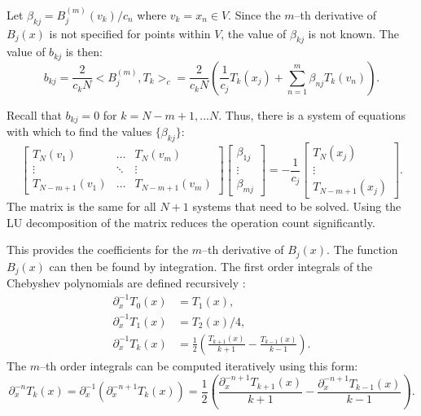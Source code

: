 \documentclass{sfuthesis}
\begin{document}
Let $\beta_{kj} = B^{(m)}_j (v_k)/c_n$ where $v_k = x_n \in V$.
Since the $m$--th derivative of $B_j(x)$ is not specified for points within $V$, the value of $\beta_{kj}$ is not known.
The value of $b_{kj}$ is then:
\begin{equation}
b_{kj} = \frac{2}{c_k N} <B_j^{(m)}, T_k>_c = \frac{2}{c_k N} \left ( \frac{1}{c_j} T_k(x_j) + \sum_{n=1}^m \beta_{nj} T_k(v_n) \right ).
\end{equation}

Recall that $b_{kj} = 0$ for $k = N-m+1,...N$.
Thus, there is a system of equations with which to find the values $\{ \beta_{kj} \}$:
\begin{equation}
\begin{bmatrix} T_N(v_1) & \dots & T_N(v_m) \\ \vdots & \ddots & \vdots \\ T_{N-m+1}(v_1) & \dots & T_{N-m+1}(v_m) \end{bmatrix}
\begin{bmatrix} \beta_{1j} \\ \vdots \\ \beta_{mj} \end{bmatrix} = 
- \frac{1}{c_j} \begin{bmatrix} T_N(x_j) \\ \vdots \\ T_{N-m+1}(x_j) \end{bmatrix} .
\end{equation}
The matrix is the same for all $N+1$ systems that need to be solved.
Using the LU decomposition of the matrix reduces the operation count significantly.

This provides the coefficients for the $m$--th derivative of $B_j(x)$.
The function $B_j(x)$ can then be found by integration.
The first order integrals of the Chebyshev polynomials are defined recursively \cite{mason2002chebyshev}:
\begin{equation} \label{integrals}
\begin{aligned}
 \partial_x^{-1} T_0(x) & = T_1(x), \\
 \partial_x^{-1} T_1(x) & = T_2(x) / 4, \\
 \partial_x^{-1}T_k(x) & = \frac{1}{2} \left ( \frac{T_{k+1}(x)}{k+1} - \frac{T_{k-1}(x)}{k-1} \right ).
\end{aligned}
\end{equation}
The $m$--th order integrals can be computed iteratively using this form:
\begin{equation}
\partial_x^{-n}T_k(x) = \partial_x^{-1} ( \partial_x^{-n+1} T_k(x) ) = \frac{1}{2} \left ( \frac{\partial_x^{-n+1} T_{k+1}(x)}{k+1} - \frac{\partial_x^{-n+1} T_{k-1}(x)}{k-1} \right ).
\end{equation}
\end{document}
